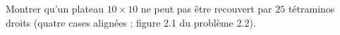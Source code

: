 Montrer qu'un plateau $10 \times 10$ ne peut pas être recouvert par $25$ tétraminos droits (quatre cases alignées ; figure 2.1 du problème 2.2).
